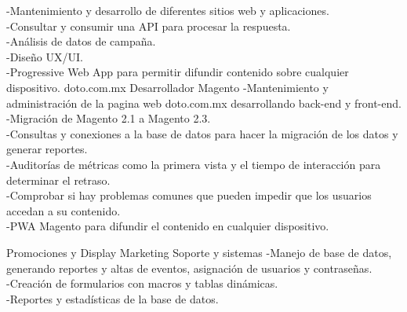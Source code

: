 \documentclass[%
	       doublesided,
	       paper=a4,
	       fontsize=10pt
	      ]{my-resume}
\begin{document}
{	{
	    -Mantenimiento y desarrollo de diferentes sitios web y aplicaciones.\\ 
	    -Consultar y consumir una API para procesar la respuesta.\\ 
	    -Análisis de datos de campaña.\\
	    -Diseño UX/UI.\\
	    -Progressive Web App para permitir difundir contenido sobre cualquier dispositivo.
	    }
	{doto.com.mx}
	{Desarrollador Magento}
	{
	    -Mantenimiento y administración de la pagina web doto.com.mx desarrollando back-end y front-end.\\
	    -Migración de Magento 2.1 a Magento 2.3.\\
	    -Consultas y conexiones a la base de datos para hacer la migración de los datos y generar reportes.\\ 
	    -Auditorías de métricas como la primera vista y el tiempo de interacción para determinar el retraso.\\ 
	    -Comprobar si hay problemas comunes que pueden impedir que los usuarios accedan a su contenido.\\
	    -PWA Magento para difundir el contenido en cualquier dispositivo.
	}
    
	{Promociones y Display Marketing}
	{Soporte y sistemas}
	{
	    -Manejo de base de datos, generando reportes y altas de eventos, asignación de usuarios y contraseñas.\\
	    -Creación de formularios con macros y tablas dinámicas.\\ 
	    -Reportes y estadísticas de la base de datos.
    }
}
\end{document}
